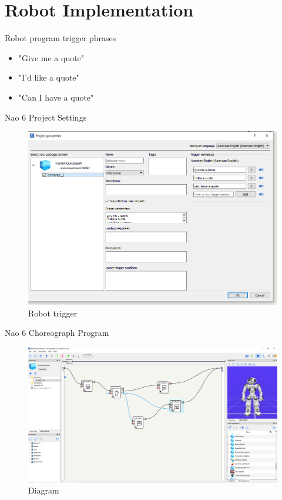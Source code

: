 \section{Robot Implementation}
    
    \frame{\sectionpage}
    
    \begin{frame}{Robot program trigger phrases}
    	\begin{itemize}
    		\item "Give me a quote"
    		\item "I'd like a quote"
    		\item "Can I have a quote"
    	\end{itemize}
    \end{frame}
    
    \begin{frame}{Nao 6 Project Settings}
    	\begin{figure}
    		\centering
    		\includegraphics[width =0.7\linewidth]{robot-spark-proj/screenshot-3.PNG}
    		\caption{Robot trigger}
    	\end{figure}
    	
    \end{frame}
    
    \begin{frame}{Nao 6 Choreograph Program}
    	\begin{figure}
    		\centering
    		\includegraphics[width =1\linewidth]{robot-spark-proj/screenshot-1.PNG}
    		\caption{Diagram}
    	\end{figure}
    	
    \end{frame}


